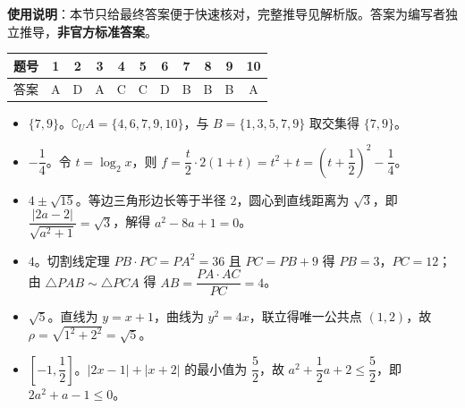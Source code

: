 
\begin{gknotice}
\textbf{使用说明}：本节只给最终答案便于快速核对，完整推导见解析版。答案为编写者独立推导，\textbf{非官方标准答案}。
\end{gknotice}

\begin{center}\begin{tabular}{ccccccccccc}
\toprule
题号 & 1 & 2 & 3 & 4 & 5 & 6 & 7 & 8 & 9 & 10 \\
\midrule
答案 & A & D & A & C & C & D & B & B & B & A \\
\bottomrule
\end{tabular}\end{center}

\begin{itemize}[leftmargin=2.6em]
  \item[\textbf{11.}] $\{7,9\}$。$\complement_U A=\{4,6,7,9,10\}$，与 $B=\{1,3,5,7,9\}$ 取交集得 $\{7,9\}$。
  \item[\textbf{12.}] $-\dfrac14$。令 $t=\log_2x$，则 $f=\dfrac t2\cdot2(1+t)=t^2+t=\left(t+\dfrac12\right)^2-\dfrac14$。
  \item[\textbf{13.}] $4\pm\sqrt{15}$。等边三角形边长等于半径 $2$，圆心到直线距离为 $\sqrt3$，即 $\dfrac{|2a-2|}{\sqrt{a^2+1}}=\sqrt3$，解得 $a^2-8a+1=0$。
  \item[\textbf{14.}] $4$。切割线定理 $PB\cdot PC=PA^2=36$ 且 $PC=PB+9$ 得 $PB=3$，$PC=12$；由 $\triangle PAB\sim\triangle PCA$ 得 $AB=\dfrac{PA\cdot AC}{PC}=4$。
  \item[\textbf{15.}] $\sqrt5$。直线为 $y=x+1$，曲线为 $y^2=4x$，联立得唯一公共点 $(1,2)$，故 $\rho=\sqrt{1^2+2^2}=\sqrt5$。
  \item[\textbf{16.}] $\left[-1,\dfrac12\right]$。$|2x-1|+|x+2|$ 的最小值为 $\dfrac52$，故 $a^2+\dfrac12a+2\leqslant\dfrac52$，即 $2a^2+a-1\leqslant0$。
\end{itemize}


